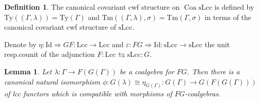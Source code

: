 \documentclass{article}
\newtheorem{lemma}{Lemma}
\theoremstyle{remark}
\theoremstyle{definition}
\newtheorem{definition}{Definition}
\begin{document}
\begin{definition}
  The canonical covariant cwf structure on $\operatorname{Coa} \mathrm{sLcc}$ is defined by $\mathrm{Ty}((\Gamma, \lambda)) = \mathrm{Ty}(\Gamma)$ and $\mathrm{Tm}((\Gamma, \lambda), \sigma) = \mathrm{Tm}(\Gamma, \sigma)$ in terms of the canonical covariant cwf structure of $\mathrm{sLcc}$.
\end{definition}

Denote by $\eta : \mathrm{Id} \Rightarrow G F : \mathrm{Lcc} \rightarrow \mathrm{Lcc}$ and $\varepsilon : F G \Rightarrow \mathrm{Id} : \mathrm{sLcc} \rightarrow \mathrm{sLcc}$ the unit resp.\@ counit of the adjunction $F : \mathrm{Lcc} \leftrightarrows \mathrm{sLcc} : G$.
\begin{lemma}
  \label{lem:coalgebra-vs-eta}
  Let $\lambda : \Gamma \rightarrow F(G(\Gamma))$ be a coalgebra for $FG$.
  Then there is a canonical natural isomorphism $\phi : G(\lambda) \cong \eta_{G(\Gamma)} : G(\Gamma) \rightarrow G(F(G(\Gamma)))$ of lcc functors which is compatible with morphisms of $FG$-coalgebras.
\end{lemma}
\end{document}
